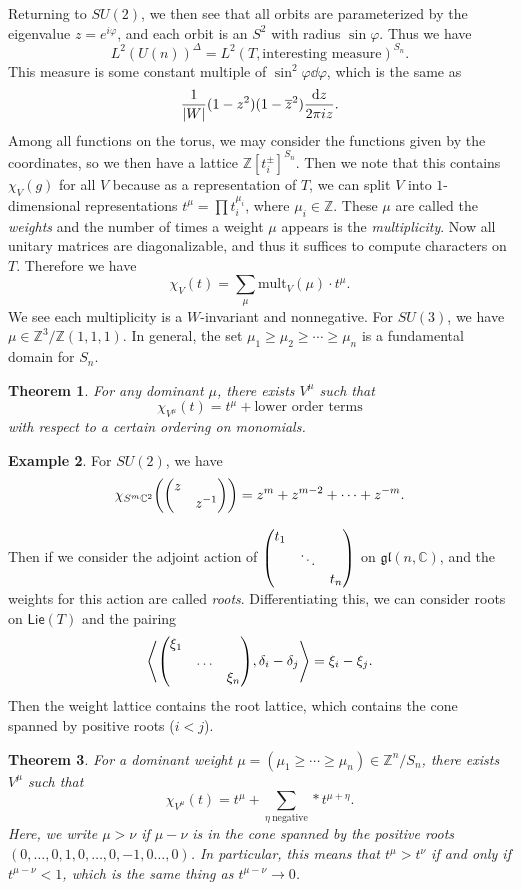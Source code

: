 \documentclass[leqno, openany]{memoir}
\newtheorem{thm}{Theorem}[section]
\theoremstyle{definition}
\newtheorem{exm}[thm]{Example}
\theoremstyle{remark}
\theoremstyle{plain}
\theoremstyle{definition}
\theoremstyle{remark}
\newcommand{\C}{\mathbb{C}}
\newcommand{\Z}{\mathbb{Z}}
\newcommand{\mf}[1]{\mathfrak{#1}}
\newcommand{\ms}[1]{\mathsf{#1}}
\newcommand{\ol}[1]{\overline{#1}}
\begin{document}
Returning to $SU(2)$, we then see that all orbits are parameterized by the eigenvalue $z = e^{i \varphi}$, and each orbit is an $S^2$ with radius $\sin \varphi$. Thus we have
\[ L^2(U(n))^{\Delta} = L^2(T, \text{interesting measure})^{S_n}. \]
This measure is some constant multiple of $\sin^2 \varphi \dd{\varphi}$, which is the same as
\[ \frac{1}{\abs{W}} (1-z^2)(1- \ol{z}^2) \frac{\dd{z}}{2 \pi i z}. \]
Among all functions on the torus, we may consider the functions given by the coordinates, so we then have a lattice $\Z[t_i^{\pm}]^{S_n}$. Then we note that this contains $\chi_V(g)$ for all $V$ because as a representation of $T$, we can split $V$ into $1$-dimensional representations $t^{\mu} = \prod t_i^{\mu_i}$, where $\mu_i \in \Z$. These $\mu$ are called the \textit{weights} and the number of times a weight $\mu$ appears is the \textit{multiplicity}. Now all unitary matrices are diagonalizable, and thus it suffices to compute characters on $T$. Therefore we have
\[ \chi_V(t) = \sum_{\mu} \text{mult}_V(\mu) \cdot t^{\mu}. \]
We see each multiplicity is a $W$-invariant and nonnegative. For $SU(3)$, we have $\mu \in \Z^3 / \Z(1,1,1)$. In general, the set $\mu_1 \geq \mu_2 \geq \cdots \geq \mu_n$ is a fundamental domain for $S_n$.

\begin{thm}
    For any dominant $\mu$, there exists $V^{\mu}$ such that 
    \[ \chi_{V^{\mu}}(t) = t^{\mu} + \text{lower order terms} \]
    with respect to a certain ordering on monomials.
\end{thm}

\begin{exm}
    For $SU(2)$, we have
    \[ \chi_{S^m \C^2} \qty( \mqty(\dmat{z, z^{-1}}) ) = z^m + z^{m-2} + \cdots + z^{-m}. \]
\end{exm}

Then if we consider the adjoint action of $\mqty(\dmat{t_1, \ddots, t_n})$ on $\mf{gl}(n, \C)$, and the weights for this action are called \textit{roots}. Differentiating this, we can consider roots on $\ms{Lie}(T)$ and the pairing
\[ \ev{\mqty(\dmat{\xi_1, \ldots, \xi_n}), \delta_i - \delta_j} = \xi_i - \xi_j. \]
Then the weight lattice contains the root lattice, which contains the cone spanned by positive roots ($i < j$). 

\begin{thm}
    For a dominant weight $\mu = (\mu_1 \geq \cdots \geq \mu_n) \in \Z^n / S_n$, there exists $V^{\mu}$ such that 
    \[ \chi_{V^{\mu}}(t) = t^{\mu} + \sum_{\eta\ \text{negative}} * t^{\mu + \eta}. \]
    Here, we write $\mu > \nu$ if $\mu - \nu$ is in the cone spanned by the positive roots $(0, \ldots, 0, 1, 0, \ldots, 0, -1, 0 \ldots, 0)$. In particular, this means that $t^{\mu} > t^{\nu}$ if and only if $t^{\mu - \nu} < 1$, which is the same thing as $t^{\mu-\nu} \to 0$.
\end{thm}
\end{document}
